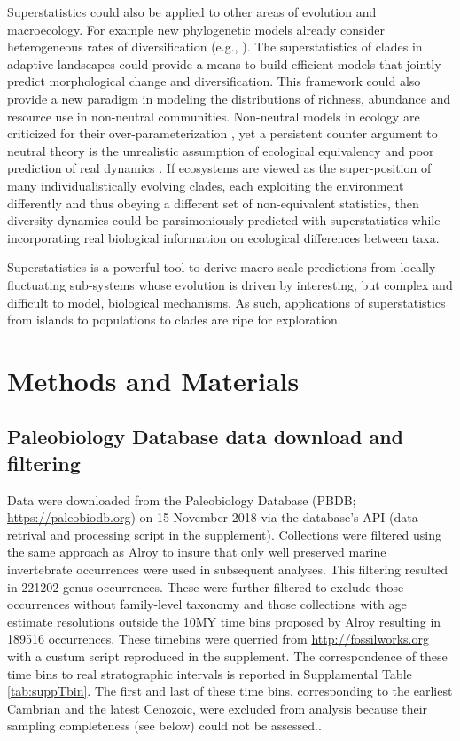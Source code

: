 \documentclass[12pt]{article}
\let\citep=\cite
\begin{document}
Superstatistics could also be applied to other areas of evolution and
macroecology.  For example new phylogenetic models already consider
heterogeneous rates of diversification (e.g.,
\citep{rabosky2006laser}). The superstatistics of clades in adaptive
landscapes could provide a means to build efficient models that
jointly predict morphological change and diversification. This
framework could also provide a new paradigm in modeling the
distributions of richness, abundance and resource use in non-neutral
communities. Non-neutral models in ecology are criticized for their
over-parameterization \citep{rosindell2011}, yet a persistent counter
argument to neutral theory \citep{hubbell2001} is the unrealistic
assumption of ecological equivalency \citep{chave2004neutral} and poor
prediction of real dynamics \citep{ricklefs2006neutral}. If ecosystems
are viewed as the super-position of many individualistically evolving
clades, each exploiting the environment differently and thus obeying a
different set of non-equivalent statistics, then diversity dynamics
could be parsimoniously predicted with superstatistics while
incorporating real biological information on ecological differences
between taxa.

Superstatistics is a powerful tool to derive macro-scale predictions
from locally fluctuating sub-systems whose evolution is driven by
interesting, but complex and difficult to model, biological
mechanisms. As such, applications of superstatistics from islands to
populations to clades are ripe for exploration.


\section*{Methods and Materials}

\subsection*{Paleobiology Database data download and filtering}
Data were downloaded from the Paleobiology Database (PBDB;
\url{https://paleobiodb.org}) on 15 November 2018 via the database's
API (data retrival and processing script in the
supplement). Collections were filtered using the same approach as
Alroy \citep{alroy08} to insure that only well preserved marine
invertebrate occurrences were used in subsequent analyses. This
filtering resulted in 221202 genus occurrences. These were further
filtered to exclude those occurrences without family-level taxonomy
and those collections with age estimate resolutions outside the 10MY
time bins proposed by Alroy \citep{alroy08} resulting in 189516
occurrences. These timebins were querried from
\url{http://fossilworks.org} with a custum script reproduced in the
supplement. The correspondence of these time bins to real
stratographic intervals is reported in Supplamental Table
\ref{tab:suppTbin}. The first and last of these time bins,
corresponding to the earliest Cambrian and the latest Cenozoic, were
excluded from analysis because their sampling completeness (see below)
could not be assessed..
\end{document}

